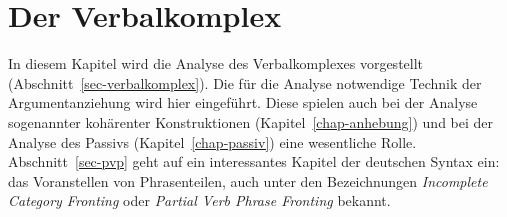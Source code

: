 

\chapter{Der Verbalkomplex}
\label{chap-verbalkomplex}



%


In diesem Kapitel wird die Analyse des Verbalkomplexes vorgestellt (Abschnitt~\ref{sec-verbalkomplex}).
Die für die Analyse notwendige Technik der Argumentanziehung wird hier eingeführt. Diese spielen
auch bei der Analyse sogenannter kohärenter Konstruktionen (Kapitel~\ref{chap-anhebung}) und bei
der Analyse des Passivs (Kapitel~\ref{chap-passiv}) eine wesentliche Rolle. Abschnitt~\ref{sec-pvp}
geht auf ein interessantes Kapitel der deutschen Syntax ein: das Voranstellen von Phrasenteilen,
auch unter den Bezeichnungen \emph{Incomplete Category Fronting} oder \emph{Partial Verb Phrase Fronting}
bekannt.

